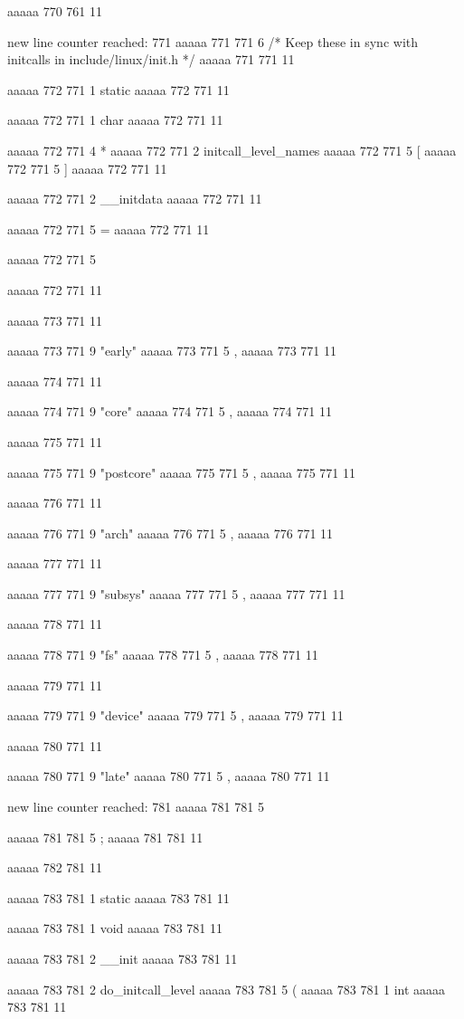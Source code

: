 aaaaa 770 761
11


new line counter reached: 771
aaaaa 771 771
6
/* Keep these in sync with initcalls in include/linux/init.h */
aaaaa 771 771
11


aaaaa 772 771
1
static
aaaaa 772 771
11
 
aaaaa 772 771
1
char
aaaaa 772 771
11
 
aaaaa 772 771
4
*
aaaaa 772 771
2
initcall_level_names
aaaaa 772 771
5
[
aaaaa 772 771
5
]
aaaaa 772 771
11
 
aaaaa 772 771
2
__initdata
aaaaa 772 771
11
 
aaaaa 772 771
5
=
aaaaa 772 771
11
 
aaaaa 772 771
5
{
aaaaa 772 771
11


aaaaa 773 771
11
	
aaaaa 773 771
9
"early"
aaaaa 773 771
5
,
aaaaa 773 771
11


aaaaa 774 771
11
	
aaaaa 774 771
9
"core"
aaaaa 774 771
5
,
aaaaa 774 771
11


aaaaa 775 771
11
	
aaaaa 775 771
9
"postcore"
aaaaa 775 771
5
,
aaaaa 775 771
11


aaaaa 776 771
11
	
aaaaa 776 771
9
"arch"
aaaaa 776 771
5
,
aaaaa 776 771
11


aaaaa 777 771
11
	
aaaaa 777 771
9
"subsys"
aaaaa 777 771
5
,
aaaaa 777 771
11


aaaaa 778 771
11
	
aaaaa 778 771
9
"fs"
aaaaa 778 771
5
,
aaaaa 778 771
11


aaaaa 779 771
11
	
aaaaa 779 771
9
"device"
aaaaa 779 771
5
,
aaaaa 779 771
11


aaaaa 780 771
11
	
aaaaa 780 771
9
"late"
aaaaa 780 771
5
,
aaaaa 780 771
11


new line counter reached: 781
aaaaa 781 781
5
}
aaaaa 781 781
5
;
aaaaa 781 781
11


aaaaa 782 781
11


aaaaa 783 781
1
static
aaaaa 783 781
11
 
aaaaa 783 781
1
void
aaaaa 783 781
11
 
aaaaa 783 781
2
__init
aaaaa 783 781
11
 
aaaaa 783 781
2
do_initcall_level
aaaaa 783 781
5
(
aaaaa 783 781
1
int
aaaaa 783 781
11
 
